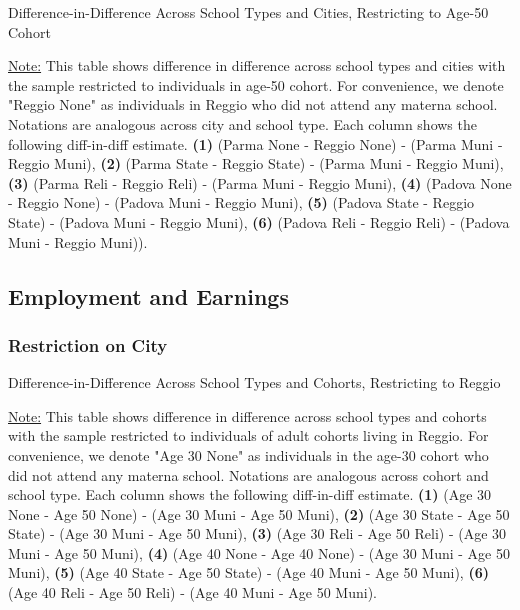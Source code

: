 \documentclass[11pt]{article}
\begin{document}
\begin{table}[H]
\begin{center}
	\caption{Difference-in-Difference Across School Types and Cities, Restricting to Age-50 Cohort} \label{table:ECh-50}
	\scalebox{0.80}{
		}
\end{center}
\footnotesize
\underline{Note:} This table shows difference in difference across school types and cities with the sample restricted to individuals in age-50 cohort. For convenience, we denote "Reggio None" as individuals in Reggio who did not attend any materna school. Notations are analogous across city and school type. Each column shows the following diff-in-diff estimate. \textbf{(1)} (Parma None - Reggio None) - (Parma Muni - Reggio Muni), \textbf{(2)} (Parma State - Reggio State) - (Parma Muni - Reggio Muni), \textbf{(3)} (Parma Reli - Reggio Reli) - (Parma Muni - Reggio Muni), \textbf{(4)} (Padova None - Reggio None) - (Padova Muni - Reggio Muni),  \textbf{(5)} (Padova State - Reggio State) - (Padova Muni - Reggio Muni), \textbf{(6)} (Padova Reli - Reggio Reli) - (Padova Muni - Reggio Muni)). 
\end{table}




\subsection{Employment and Earnings}

\subsubsection{Restriction on City}
\begin{table}[H]
\begin{center}
	\caption{Difference-in-Difference Across School Types and Cohorts, Restricting to Reggio} \label{table:WC-Reggio}
	\scalebox{0.80}{
		}
\end{center}
\footnotesize
\underline{Note:} This table shows difference in difference across school types and cohorts with the sample restricted to individuals of adult cohorts living in Reggio. For convenience, we denote "Age 30 None" as individuals in the age-30 cohort who did not attend any materna school. Notations are analogous across cohort and school type. Each column shows the following diff-in-diff estimate. \textbf{(1)} (Age 30 None - Age 50 None) - (Age 30 Muni - Age 50 Muni), \textbf{(2)} (Age 30 State - Age 50 State) - (Age 30 Muni - Age 50 Muni), \textbf{(3)} (Age 30 Reli - Age 50 Reli) - (Age 30 Muni - Age 50 Muni), \textbf{(4)} (Age 40 None - Age 40 None) - (Age 30 Muni - Age 50 Muni),  \textbf{(5)} (Age 40 State - Age 50 State) - (Age 40 Muni - Age 50 Muni), \textbf{(6)} (Age 40 Reli - Age 50 Reli) - (Age 40 Muni - Age 50 Muni). 
\end{table}
\end{document}

